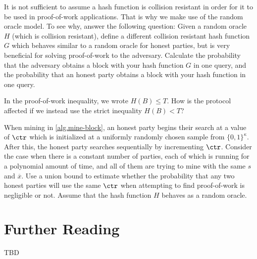 \begin{problems}
  \item It is not sufficient to assume a hash function is collision resistant in order
  for it to be used in proof-of-work applications. That is why we make use of
  the random oracle model. To see why, answer the following question:
  Given a random oracle $H$ (which is collision resistant), define a different
  collision resistant hash function $G$ which behaves similar to a random oracle
  for honest parties, but is very beneficial for solving proof-of-work
  to the adversary. Calculate the probability that the adversary obtains a
  block with your hash function $G$ in one query, and the probability that
  an honest party obtains a block with your hash function in one query.\label{problem.small-hash}

  \item In the proof-of-work inequality, we wrote $H(B) \leq T$.
  How is the protocol affected if we instead use the strict inequality $H(B) < T$?

  \item When mining in \cref{alg.mine-block}, an honest party begins their search at a
        value of $\ctr$ which is initialized at a uniformly randomly chosen sample from $\{0, 1\}^\kappa$.
        After this, the honest party searches sequentially by incrementing $\ctr$.
        Consider the case when there is a constant number of parties, each of which is running for a
        polynomial amount of time, and all of them are trying to mine with the same $s$ and $\overline{x}$.
        Use a union bound to estimate whether the probability that any two honest parties will use
        the same $\ctr$ when attempting to find proof-of-work is negligible or not.
        Assume that the hash function $H$ behaves as a random oracle.
\end{problems}

\section*{Further Reading}

TBD
